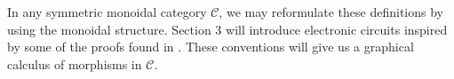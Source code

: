 \documentclass[../thesis.tex]{subfiles}
\begin{document}
            In any symmetric monoidal category $\mathcal{C}$, we may reformulate these definitions by using the monoidal structure. Section 3 will introduce electronic circuits inspired by some of the proofs found in \cite{Loday12}. These conventions will give us a graphical calculus of morphisms in $\mathcal{C}$.
                    




                    



\end{document}
